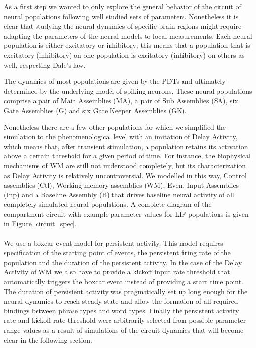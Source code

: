 \documentclass[10pt]{article}
\begin{document}
As a first step we wanted to only explore the general behavior of the circuit of neural populations following well studied sets of parameters.
Nonetheless it is clear that studying the neural dynamics of specific brain regions might require adapting the parameters of the neural models to local measurements.
Each neural population is either excitatory or inhibitory; this means that a population that is excitatory (inhibitory) on one population is excitatory (inhibitory) on others as well, respecting Dale's law.

The dynamics of most populations are given by the PDTs and ultimately determined by the underlying model of spiking neurons.
These neural populations comprise a pair of Main Assemblies (MA), a pair of Sub Assemblies (SA), six Gate Assemblies (G) and six Gate Keeper Assemblies (GK).

Nonetheless there are a few other populations for which we simplified the simulation to the phenomenological level with an imitation of Delay Activity, which means that, after transient stimulation, a population retains its activation above a certain threshold for a given period of time.
For instance, the biophysical mechanisms of WM are still not understood completely, but its characterization as Delay Activity is relatively uncontroversial.
We modelled in this way, Control assemblies (Ctl), Working memory assemblies (WM), Event Input Assemblies (Inp) and a Baseline Assembly (B) that drives baseline neural activity of all completely simulated neural populations.
A complete diagram of the compartment circuit with example parameter values for LIF populations is given in Figure \ref{circuit_spec}.\\~\\

We use a boxcar event model for persistent activity. This model requires specification of the starting point of events, the persistent firing rate of the population and the duration of the persistent activity.
In the case of the Delay Activity of WM we also have to provide a kickoff input rate threshold that automatically triggers the boxcar event instead of providing a start time point.
The duration of persistent activity was pragmatically set up long enough for the neural dynamics to reach steady state and allow the formation of  all required bindings between phrase types and 
word types.
Finally the persistent activity rate and kickoff rate threshold were arbitrarily selected from possible parameter range values as a result of simulations of the circuit dynamics that will become clear in the following section.
\end{document}
